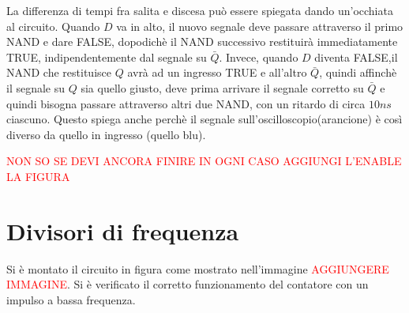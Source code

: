 \documentclass[10pt,a4paper]{article}
\begin{document}
La differenza di tempi fra salita e discesa può essere spiegata dando un'occhiata al circuito. Quando $D$ va in alto, il nuovo segnale deve passare attraverso il primo NAND e dare FALSE, dopodichè il NAND successivo restituirà immediatamente TRUE, indipendentemente dal segnale su $\bar{Q}$. Invece, quando $D$ diventa FALSE,il NAND che restituisce $Q$ avrà ad un ingresso TRUE e all'altro $\bar{Q}$, quindi affinchè il segnale su $Q$ sia quello giusto, deve prima arrivare il segnale corretto su $\bar{Q}$ e quindi bisogna passare attraverso altri due NAND, con un ritardo di circa $10 ns$ ciascuno. Questo spiega anche perchè il segnale sull'oscilloscopio(arancione) è così diverso da quello in ingresso (quello blu).

\textcolor{red}{NON SO SE DEVI ANCORA FINIRE IN OGNI CASO AGGIUNGI L'ENABLE LA FIGURA}
\section{ Divisori di frequenza }
Si è montato il circuito in figura come mostrato nell'immagine \textcolor{red}{AGGIUNGERE IMMAGINE}.
Si è verificato il corretto funzionamento del contatore con un impulso a bassa frequenza.
\end{document}
